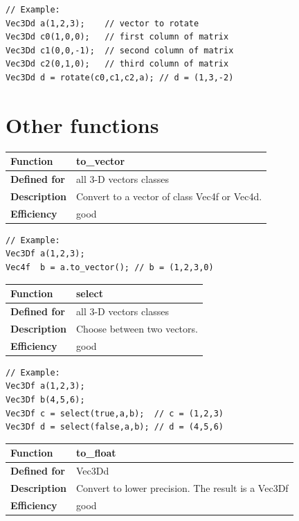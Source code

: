 \documentclass[11pt,a4paper,oneside,openright]{report}
\newcommand{\vspacesmall}{\vspace{3mm}}
\newcommand{\vspacebig}{\vspace{6mm}}
\begin{document}
\begin{lstlisting}[frame=none]
// Example:
Vec3Dd a(1,2,3);    // vector to rotate
Vec3Dd c0(1,0,0);   // first column of matrix
Vec3Dd c1(0,0,-1);  // second column of matrix
Vec3Dd c2(0,1,0);   // third column of matrix
Vec3Dd d = rotate(c0,c1,c2,a); // d = (1,3,-2)
\end{lstlisting}
\vspacebig


\chapter{Other functions}\label{chap:OtherFunctions}

\begin{tabular}{|p{25mm}|p{100mm}|}
\hline
\bfseries Function & to\_vector \\ \hline
\bfseries Defined for & all 3-D vectors classes \\ \hline
\bfseries Description & Convert to a vector of class Vec4f or Vec4d. \\ \hline
\bfseries Efficiency & good \\ \hline
\end{tabular}
\vspacesmall

\begin{lstlisting}[frame=none]
// Example:
Vec3Df a(1,2,3);
Vec4f  b = a.to_vector(); // b = (1,2,3,0)
\end{lstlisting}
\vspacebig


\begin{tabular}{|p{25mm}|p{100mm}|}
\hline
\bfseries Function & select \\ \hline
\bfseries Defined for & all 3-D vectors classes  \\ \hline
\bfseries Description & Choose between two vectors. \\ \hline
\bfseries Efficiency & good \\ \hline
\end{tabular}
\vspacesmall

\begin{lstlisting}[frame=none]
// Example:
Vec3Df a(1,2,3);
Vec3Df b(4,5,6);
Vec3Df c = select(true,a,b);  // c = (1,2,3)
Vec3Df d = select(false,a,b); // d = (4,5,6)
\end{lstlisting}
\vspacebig


\begin{tabular}{|p{25mm}|p{100mm}|}
\hline
\bfseries Function & to\_float \\ \hline
\bfseries Defined for & Vec3Dd  \\ \hline
\bfseries Description & Convert to lower precision. The result is a Vec3Df \\ \hline
\bfseries Efficiency & good \\ \hline
\end{tabular}
\vspacesmall
\end{document}
